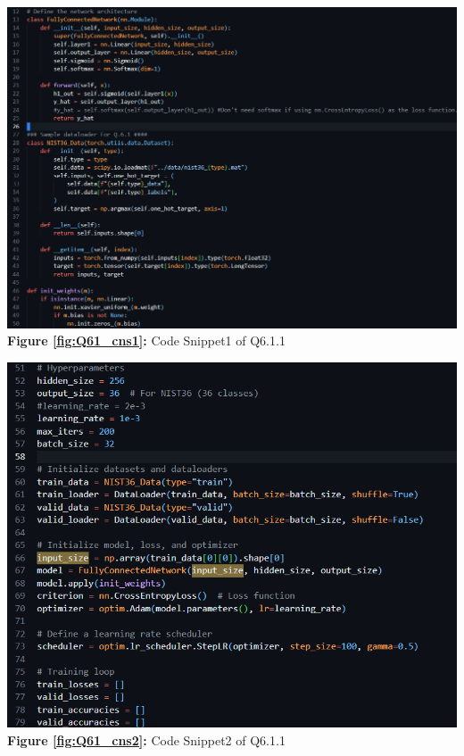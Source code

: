 \documentclass{article}
\begin{document}
\begin{minipage}{0.48\linewidth}
	\centering
	\includegraphics[width=\linewidth]{./Q6_1_cns1.png}
	\textbf{Figure \ref{fig:Q61_cns1}:} Code Snippet1 of Q6.1.1 %
	\label{fig:Q61_cns1}         %
\end{minipage}
\hfill
\begin{minipage}{0.48\linewidth}
	\centering
	\includegraphics[width=\linewidth]{./Q6_1_cns2.png}
	\textbf{Figure \ref{fig:Q61_cns2}:} Code Snippet2 of Q6.1.1  %
	\label{fig:Q61_cns2}         %
\end{minipage}	
\end{document}
